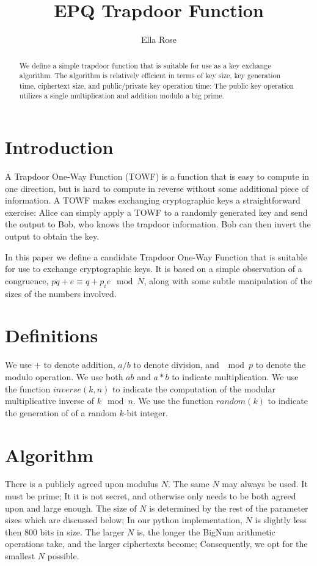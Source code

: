 \documentclass[preprint]{iacrtrans}
\author{Ella Rose}
\institute{Paso Robles, CA \email{python_pride@protonmail.com}}
\title[EPQ Trapdoor Function]{EPQ Trapdoor Function}
\begin{document}
\maketitle


\begin{abstract}
 We define a simple trapdoor function that is suitable for use as a key exchange algorithm. The algorithm is relatively efficient in terms of key size, key generation time, ciphertext size, and public/private key operation time: The public key operation utilizes a single multiplication and addition modulo a big prime.
 \end{abstract}

\todototoc
\listoftodos


\section{Introduction}
A Trapdoor One-Way Function (TOWF) is a function that is easy to compute in one direction, but is hard to compute in reverse without some additional piece of information. A TOWF makes exchanging cryptographic keys a straightforward exercise: Alice can simply apply a TOWF to a randomly generated key and send the output to Bob, who knows the trapdoor information. Bob can then invert the output to obtain the key. 

In this paper we define a candidate Trapdoor One-Way Function that is suitable for use to exchange cryptographic keys. It is based on a simple observation of a congruence, $pq + e \equiv q + p_i e \mod N$, along with some subtle manipulation of the sizes of the numbers involved.

\section{Definitions}
We use $+$ to denote addition, $a / b$ to denote division, and $\mod p$ to denote the modulo operation. We use both $a b$ and $a * b$ to indicate multiplication. We use the function $inverse(k, n)$ to indicate the computation of the modular multiplicative inverse of $k \mod n$. We use the function $random(k)$ to indicate the generation of of a random $k$-bit integer.

\section{Algorithm}
There is a publicly agreed upon modulus $N$. The same $N$ may always be used. It must be prime; It it is not secret, and otherwise only needs to be both agreed upon and large enough. The size of $N$ is determined by the rest of the parameter sizes which are discussed below; In our python implementation, $N$ is slightly less then 800 bits in size. The larger $N$ is, the longer the BigNum arithmetic operations take, and the larger ciphertexts become; Consequently, we opt for the smallest $N$ possible.
\end{document}
